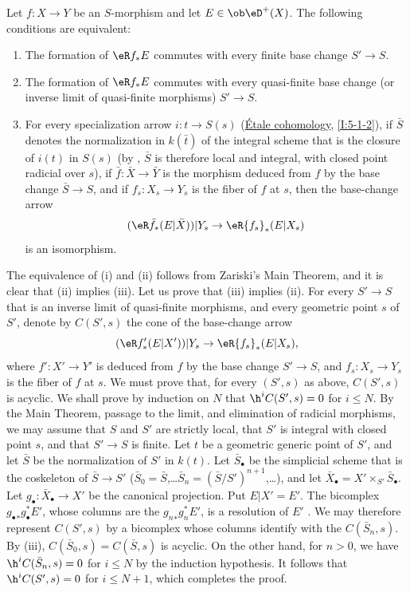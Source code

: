 \documentclass[oneside]{book}
\begin{document}
\begin{proposition}\label{VII:5-1-1}
Let $f:X\to Y$ be an $S$-morphism and let $E\in\ob \eD^+(X)$. The following
conditions are equivalent:
\begin{enumerate}[\indent (i)]
  \item The formation of $\eR f_\ast E$ commutes with every finite base change
    $S'\to S$.
  \item The formation of $\eR f_\ast E$ commutes with every quasi-finite base
    change (or inverse limit of quasi-finite morphisms) $S'\to S$.
  \item For every specialization arrow $i:t\to S(s)$
    (\hyperref[I]{Étale cohomology}, \ref{I:5-1-2}), if $\bar S$ denotes
    the normalization in $k(\bar t)$ of the integral scheme that is the
    closure of $i(t)$ in $S(s)$ (by
    \cite[IV, 6.15.5, 18.6.11, 18.8.16]{ega}, $\bar S$ is therefore local and
    integral, with closed point radicial over $s$), if
    $\bar f:\bar X\to \bar Y$ is the morphism deduced from $f$ by the base
    change $\bar S\to S$, and if $f_s:X_s\to Y_s$ is the fiber of $f$ at $s$,
    then the base-change arrow
    \[
      (\eR \bar f_\ast (E|\bar X))|Y_s \to \eR {f_s}_\ast(E|X_s) 
    \]
    is an isomorphism.
\end{enumerate}
\end{proposition}

The equivalence of (i) and (ii) follows from Zariski's Main Theorem, and it is
clear that (ii) implies (iii). Let us prove that (iii) implies (ii). For every
$S'\to S$ that is an inverse limit of quasi-finite morphisms, and every
geometric point $s$ of $S'$, denote by $C(S',s)$ the cone of the base-change
arrow
\[
  (\eR f'_\ast(E|X'))|Y_s \to \eR{f_s}_\ast (E|X_s) \text{,} 
\]
where $f':X'\to Y'$ is deduced from $f$ by the base change $S'\to S$, and
$f_s:X_s\to Y_s$ is the fiber of $f$ at $s$. We must prove that, for every
$(S',s)$ as above, $C(S',s)$ is acyclic. We shall prove by induction on $N$ that
$\h^i C(S',s) = 0$ for $i\leqslant N$. By the Main Theorem, passage to the
limit, and elimination of radicial morphisms, we may assume that $S$ and $S'$
are strictly local, that $S'$ is integral with closed point $s$, and that
$S'\to S$ is finite. Let $t$ be a geometric generic point of $S'$, and let
$\bar S$ be the normalization of $S'$ in $k(t)$. Let $\bar S_\bullet$ be the
simplicial scheme that is the coskeleton of $\bar S\to S'$
($\bar S_0=\bar S$,\ldots $\bar S_n=(\bar S/S')^{n+1}$,\ldots), and let
$\bar X_\bullet=X'\times_{S'} \bar S_\bullet$. Let
$g_\bullet:\bar X_\bullet \to X'$ be the canonical projection. Put
$E|X'=E'$. The bicomplex ${g_\bullet}_\ast g_\bullet^\ast E'$, whose columns
are the ${g_n}_\ast g_n^\ast E'$, is a resolution of $E'$
\cite[VIII 8]{sga4}. We may therefore represent $C(S',s)$ by a bicomplex whose
columns identify with the $C(\bar S_n,s)$. By (iii),
$C(\bar S_0,s)=C(\bar S,s)$ is acyclic. On the other hand, for $n>0$, we have
$\h^i C(\bar S_n,s)=0$ for $i\leqslant N$ by the induction hypothesis. It
follows that $\h^i C(S',s)=0$ for $i\leqslant N+1$, which completes the proof.
\end{document}
